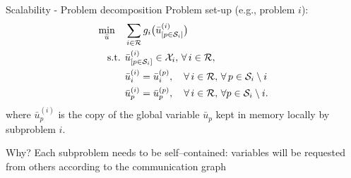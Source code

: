 \begin{frame}{Scalability - Problem decomposition}
    Problem set-up (e.g., problem $i$):
    \[
    \begin{aligned}
    \min_{\bar{u}}\quad     & \sum_{i\in\mathcal{R}} g_i \big(\bar{u}^{(i)}_{[p\in\mathcal{S}_i]} \big)\\
    \text{s.t. }          & \bar{u}^{(i)}_{[p\in\mathcal{S}_i]}\in\mathcal{X}_i, \, \forall\, i\in\mathcal{R}, \\
                          & \bar{u}^{(i)}_i = \bar{u}^{(p)}_i,\quad \forall\, i\in\mathcal{R}, \, \forall\, p\in\mathcal{S}_i\setminus i \\
                          & \bar{u}^{(i)}_p = \bar{u}^{(p)}_p, \quad \forall\, i\in\mathcal{R},\, \forall p\in\mathcal{S}_i\setminus i.
    \end{aligned}
    \]
    where $\bar{u}_p^{(i)}$ is the copy of the global variable $\bar{u}_p$ kept in memory locally by subproblem $i$.
    
    \begin{block}{Why?}
    Each subproblem needs to be self--contained: variables will be requested from others according to the communication graph
    \end{block}
\end{frame}